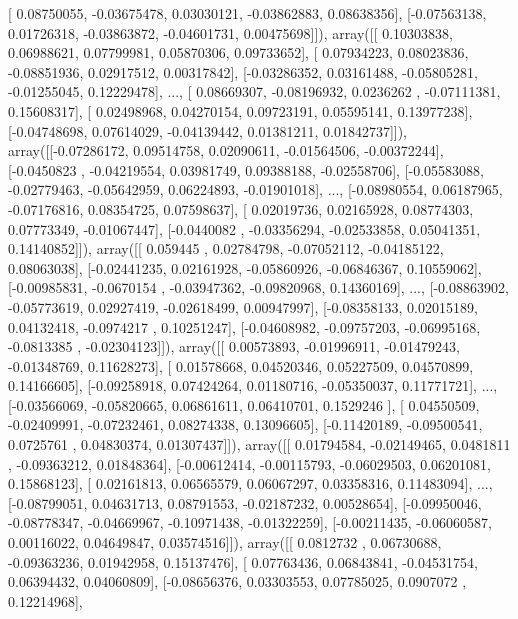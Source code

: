 \documentclass{article}
\begin{document}
       [ 0.08750055, -0.03675478,  0.03030121, -0.03862883,  0.08638356],
       [-0.07563138,  0.01726318, -0.03863872, -0.04601731,  0.00475698]]), array([[ 0.10303838,  0.06988621,  0.07799981,  0.05870306,  0.09733652],
       [ 0.07934223,  0.08023836, -0.08851936,  0.02917512,  0.00317842],
       [-0.03286352,  0.03161488, -0.05805281, -0.01255045,  0.12229478],
       ...,
       [ 0.08669307, -0.08196932,  0.0236262 , -0.07111381,  0.15608317],
       [ 0.02498968,  0.04270154,  0.09723191,  0.05595141,  0.13977238],
       [-0.04748698,  0.07614029, -0.04139442,  0.01381211,  0.01842737]]), array([[-0.07286172,  0.09514758,  0.02090611, -0.01564506, -0.00372244],
       [-0.0450823 , -0.04219554,  0.03981749,  0.09388188, -0.02558706],
       [-0.05583088, -0.02779463, -0.05642959,  0.06224893, -0.01901018],
       ...,
       [-0.08980554,  0.06187965, -0.07176816,  0.08354725,  0.07598637],
       [ 0.02019736,  0.02165928,  0.08774303,  0.07773349, -0.01067447],
       [-0.0440082 , -0.03356294, -0.02533858,  0.05041351,  0.14140852]]), array([[ 0.059445  ,  0.02784798, -0.07052112, -0.04185122,  0.08063038],
       [-0.02441235,  0.02161928, -0.05860926, -0.06846367,  0.10559062],
       [-0.00985831, -0.0670154 , -0.03947362, -0.09820968,  0.14360169],
       ...,
       [-0.08863902, -0.05773619,  0.02927419, -0.02618499,  0.00947997],
       [-0.08358133,  0.02015189,  0.04132418, -0.0974217 ,  0.10251247],
       [-0.04608982, -0.09757203, -0.06995168, -0.0813385 , -0.02304123]]), array([[ 0.00573893, -0.01996911, -0.01479243, -0.01348769,  0.11628273],
       [ 0.01578668,  0.04520346,  0.05227509,  0.04570899,  0.14166605],
       [-0.09258918,  0.07424264,  0.01180716, -0.05350037,  0.11771721],
       ...,
       [-0.03566069, -0.05820665,  0.06861611,  0.06410701,  0.1529246 ],
       [ 0.04550509, -0.02409991, -0.07232461,  0.08274338,  0.13096605],
       [-0.11420189, -0.09500541,  0.0725761 ,  0.04830374,  0.01307437]]), array([[ 0.01794584, -0.02149465,  0.0481811 , -0.09363212,  0.01848364],
       [-0.00612414, -0.00115793, -0.06029503,  0.06201081,  0.15868123],
       [ 0.02161813,  0.06565579,  0.06067297,  0.03358316,  0.11483094],
       ...,
       [-0.08799051,  0.04631713,  0.08791553, -0.02187232,  0.00528654],
       [-0.09950046, -0.08778347, -0.04669967, -0.10971438, -0.01322259],
       [-0.00211435, -0.06060587,  0.00116022,  0.04649847,  0.03574516]]), array([[ 0.0812732 ,  0.06730688, -0.09363236,  0.01942958,  0.15137476],
       [ 0.07763436,  0.06843841, -0.04531754,  0.06394432,  0.04060809],
       [-0.08656376,  0.03303553,  0.07785025,  0.0907072 ,  0.12214968],
\end{document}
